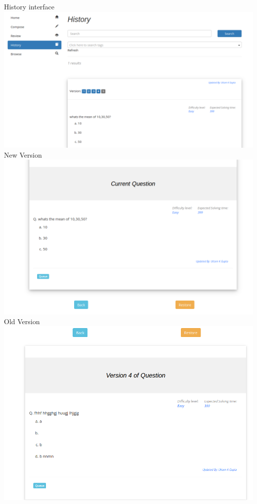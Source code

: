 \documentclass[a4paper,12pt,oneside]{book}
\begin{document}
History interface\\
\includegraphics[scale=0.3]{history.png}	\\

\vspace{2in}
New Version \\
\includegraphics[scale=0.4]{version1.png}	\\

Old Version\\
\includegraphics[scale=0.4]{version3.png}	\\
\end{document}

